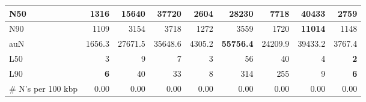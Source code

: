 \documentclass[12pt,a4paper]{article}
\begin{document}
\begin{table}[ht]
\begin{center}
\begin{tabular}{|l*{8}{|r}|}
N50 & 1316 & 15640 & 37720 & 2604 & 28230 & 7718 & {\bf 40433} & 2759 \\ \hline
N90 & 1109 & 3154 & 3718 & 1272 & 3559 & 1720 & {\bf 11014} & 1148 \\ \hline
auN & 1656.3 & 27671.5 & 35648.6 & 4305.2 & {\bf 55756.4} & 24209.9 & 39433.2 & 3767.4 \\ \hline
L50 & 3 & 9 & 7 & 3 & 56 & 40 & 4 & {\bf 2} \\ \hline
L90 & {\bf 6} & 40 & 33 & 8 & 314 & 255 & 9 & {\bf 6} \\ \hline
\# N's per 100 kbp & 0.00 & 0.00 & 0.00 & 0.00 & 0.00 & 0.00 & 0.00 & 0.00 \\ \hline
\end{tabular}
\end{center}
\end{table}
\end{document}
